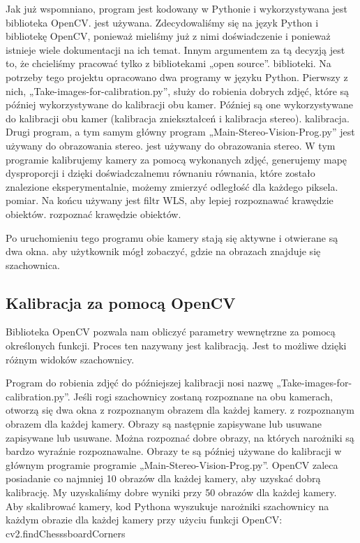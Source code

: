 \documentclass[magisterska]{pracadypl}
\begin{document}
Jak już wspomniano, program jest kodowany w Pythonie i wykorzystywana jest biblioteka OpenCV.
jest używana. Zdecydowaliśmy się na język Python i bibliotekę OpenCV, ponieważ
mieliśmy już z nimi doświadczenie i ponieważ istnieje wiele dokumentacji na ich temat. Innym
argumentem za tą decyzją jest to, że chcieliśmy pracować tylko z bibliotekami „open source”.
biblioteki.
Na potrzeby tego projektu opracowano dwa programy w języku Python.
Pierwszy z nich, „Take-images-for-calibration.py”, służy do robienia dobrych zdjęć, które są później wykorzystywane do kalibracji obu kamer.
Później są one wykorzystywane do kalibracji obu kamer (kalibracja zniekształceń i kalibracja stereo).
kalibracja.
Drugi program, a tym samym główny program „Main-Stereo-Vision-Prog.py” jest używany do obrazowania stereo.
jest używany do obrazowania stereo. W tym programie kalibrujemy kamery za pomocą wykonanych zdjęć, generujemy mapę dysproporcji i dzięki doświadczalnemu równaniu
równania, które zostało znalezione eksperymentalnie, możemy zmierzyć odległość dla każdego piksela.
pomiar. Na końcu używany jest filtr WLS, aby lepiej rozpoznawać krawędzie obiektów.
rozpoznać krawędzie obiektów.

Po uruchomieniu tego programu obie kamery stają się aktywne i otwierane są dwa okna.
aby użytkownik mógł zobaczyć, gdzie na obrazach znajduje się szachownica.


\subsection{Kalibracja za pomocą OpenCV}

Biblioteka OpenCV pozwala nam obliczyć parametry wewnętrzne za pomocą określonych funkcji.
Proces ten nazywany jest kalibracją. Jest to możliwe dzięki różnym
widoków szachownicy.

Program do robienia zdjęć do późniejszej kalibracji nosi nazwę
„Take-images-for-calibration.py”.
Jeśli rogi szachownicy zostaną rozpoznane na obu kamerach, otworzą się dwa okna z rozpoznanym obrazem dla każdej kamery.
z rozpoznanym obrazem dla każdej kamery. Obrazy są następnie zapisywane lub usuwane
zapisywane lub usuwane. Można rozpoznać dobre obrazy, na których narożniki
są bardzo wyraźnie rozpoznawalne. Obrazy te są później używane do kalibracji w głównym programie
programie „Main-Stereo-Vision-Prog.py”. OpenCV zaleca posiadanie co najmniej 10
obrazów dla każdej kamery, aby uzyskać dobrą kalibrację. My uzyskaliśmy dobre wyniki przy 50
obrazów dla każdej kamery.
Aby skalibrować kamery, kod Pythona wyszukuje narożniki szachownicy na każdym
obrazie dla każdej kamery przy użyciu funkcji OpenCV: cv2.findChesssboardCorners
\end{document}
